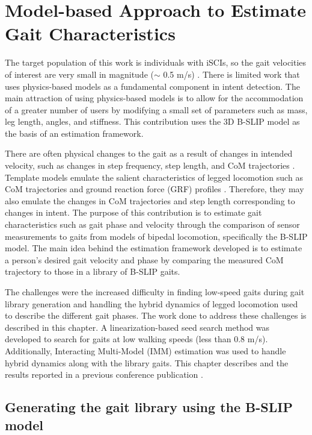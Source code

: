 \chapter{Model-based Approach to Estimate Gait Characteristics} \label{chapter:IMM}
The target population of this work is individuals with iSCIs, so the gait velocities of interest are very small in magnitude ($ \sim $ 0.5 m/s) \cite{nymark2005electromyographic}. There is limited work that uses physics-based models as a fundamental component in intent detection. The main attraction of using physics-based models is to allow for the accommodation of a greater number of users by modifying a small set of parameters such as mass, leg length, angles, and stiffness. This contribution uses the 3D B-SLIP model \cite{liu2015dynamic} as the basis of an estimation framework.

There are often physical changes to the gait as a result of changes in intended velocity, such as changes in step frequency, step length, and CoM trajectories \cite{kuo2001simple}. Template models emulate the salient characteristics of legged locomotion such as CoM trajectories and ground reaction force (GRF) profiles \cite{mochon1980ballistic}. Therefore, they may also emulate the changes in CoM trajectories and step length corresponding to changes in intent. The purpose of this contribution is to estimate gait characteristics such as gait phase and velocity through the comparison of sensor measurements to gaits from models of bipedal locomotion, specifically the B-SLIP model. The main idea behind the estimation framework developed is to estimate a person's desired gait velocity and phase by comparing the measured CoM trajectory to those in a library of B-SLIP gaits. 

The challenges were the increased difficulty in finding low-speed gaits during gait library generation and handling the hybrid dynamics of legged locomotion used to describe the different gait phases. The work done to address these challenges is described in this chapter. A linearization-based seed search method was developed to search for gaits at low walking speeds (less than 0.8 m/s). Additionally, Interacting Multi-Model (IMM) estimation was used to handle hybrid dynamics along with the library gaits. This chapter describes and the results reported in a previous conference publication \cite{karulkarapplication}.

\section{Generating the gait library using the B-SLIP model}

